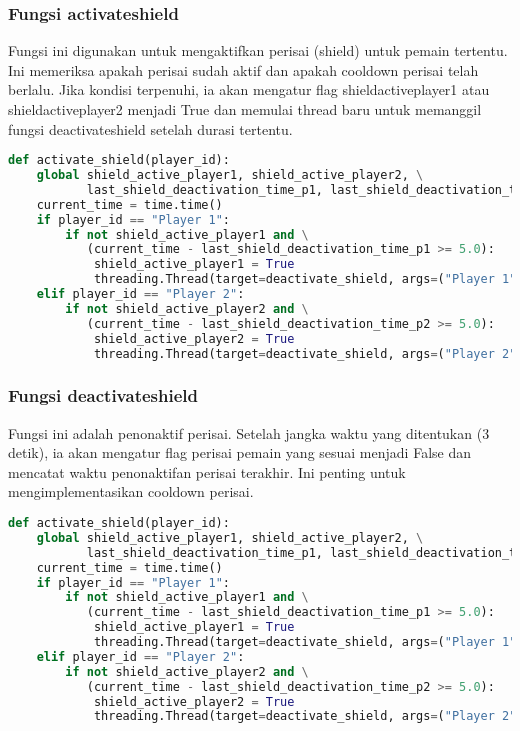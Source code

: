 \documentclass[11pt,a4paper]{article}
\begin{document}
\subsubsection{Fungsi activate\textunderscore shield}

Fungsi ini digunakan untuk mengaktifkan perisai (shield) untuk pemain tertentu. Ini memeriksa apakah perisai sudah aktif dan apakah cooldown perisai telah berlalu. Jika kondisi terpenuhi, ia akan mengatur flag shield\textunderscore active\textunderscore player1 atau shield\textunderscore active\textunderscore player2 menjadi True dan memulai thread baru untuk memanggil fungsi deactivate\textunderscore shield setelah durasi tertentu.
\begin{lstlisting}[language=Python, caption=activate\textunderscore shield]
def activate_shield(player_id):
    global shield_active_player1, shield_active_player2, \
           last_shield_deactivation_time_p1, last_shield_deactivation_time_p2
    current_time = time.time()
    if player_id == "Player 1":
        if not shield_active_player1 and \
           (current_time - last_shield_deactivation_time_p1 >= 5.0):
            shield_active_player1 = True
            threading.Thread(target=deactivate_shield, args=("Player 1",)).start()
    elif player_id == "Player 2":
        if not shield_active_player2 and \
           (current_time - last_shield_deactivation_time_p2 >= 5.0):
            shield_active_player2 = True
            threading.Thread(target=deactivate_shield, args=("Player 2",)).start()
\end{lstlisting}

\subsubsection{Fungsi deactivate\textunderscore shield}
Fungsi ini adalah penonaktif perisai. Setelah jangka waktu yang ditentukan (3 detik), ia akan mengatur flag perisai pemain yang sesuai menjadi False dan mencatat waktu penonaktifan perisai terakhir. Ini penting untuk mengimplementasikan cooldown perisai.

\begin{lstlisting}[language=Python, caption=deactivate\textunderscore shield]
def activate_shield(player_id):
    global shield_active_player1, shield_active_player2, \
           last_shield_deactivation_time_p1, last_shield_deactivation_time_p2
    current_time = time.time()
    if player_id == "Player 1":
        if not shield_active_player1 and \
           (current_time - last_shield_deactivation_time_p1 >= 5.0):
            shield_active_player1 = True
            threading.Thread(target=deactivate_shield, args=("Player 1",)).start()
    elif player_id == "Player 2":
        if not shield_active_player2 and \
           (current_time - last_shield_deactivation_time_p2 >= 5.0):
            shield_active_player2 = True
            threading.Thread(target=deactivate_shield, args=("Player 2",)).start()
\end{lstlisting}
\end{document}
